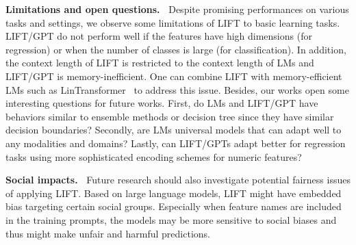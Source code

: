 \textbf{Limitations and open questions.~} Despite promising performances on various tasks and settings, we observe some limitations of \textsc{LIFT} to basic learning tasks.
\textsc{LIFT}/GPT do not perform well if the features have high dimensions (for regression) or when the number of classes is large (for classification). In addition, the context length of \textsc{LIFT} is restricted to the context length of LMs and \textsc{LIFT}/GPT is memory-inefficient. One can combine \textsc{LIFT} with memory-efficient LMs such as LinTransformer~\citep{wang2020linformer} to address this issue. Besides, our works open some interesting questions for future works. First, do LMs and \textsc{LIFT}/GPT have behaviors similar to ensemble methods or decision tree since they have similar decision boundaries? Secondly, are LMs universal models that can adapt well to any modalities and domains? Lastly, can \textsc{LIFT}/GPTs adapt better for regression tasks using more sophisticated encoding schemes for numeric features?

\textbf{Social impacts.~} Future research should also investigate potential fairness issues of applying \textsc{LIFT}. Based on large language models, \textsc{LIFT} might have embedded bias targeting certain social groups. Especially when feature names are included in the training prompts, the models may be more sensitive to social biases and thus might make unfair and harmful predictions. 


